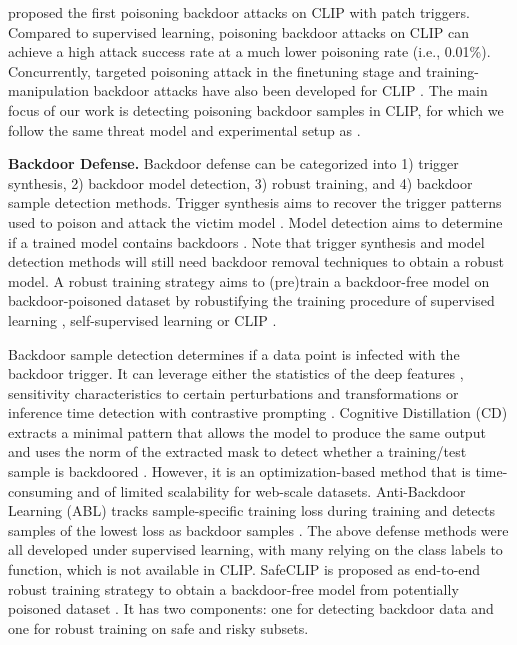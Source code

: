 \citet{carlini2022poisoning} proposed the first poisoning backdoor attacks on CLIP with patch triggers.
Compared to supervised learning, poisoning backdoor attacks on CLIP can achieve a high attack success rate at a much lower poisoning rate (i.e., 0.01\%). 
Concurrently, targeted poisoning attack in the finetuning stage \citep{yang2023data} and training-manipulation backdoor attacks have also been developed for CLIP \citep{jia2022badencoder,liu2022poisonedencoder,tao2023distribution}.
The main focus of our work is detecting poisoning backdoor samples in CLIP, for which we follow the same threat model and experimental setup as \citet{carlini2022poisoning}.


\noindent\textbf{Backdoor Defense.}
Backdoor defense can be categorized into 1) trigger synthesis, 2) backdoor model detection, 3) robust training, and 4)  backdoor sample detection methods. 
Trigger synthesis aims to recover the trigger patterns used to poison and attack the victim model \citep{liu2019abs,wang2019neural,hu2022trigger}. Model detection aims to determine if a trained model contains backdoors \citep{chen2019deepinspect,kolouri2020universal,xu2021detecting,feng2023detecting,kuang2024adversarial}. Note that trigger synthesis and model detection methods will still need backdoor removal techniques to obtain a robust model. A robust training strategy aims to (pre)train a backdoor-free model on backdoor-poisoned dataset by robustifying the training procedure of supervised learning \citep{li2021anti,borgnia2021strong,huang2022backdoor,dolatabadi2022collider}, self-supervised learning \citep{li2024difficulty} or CLIP \citep{bansal2023cleanclip,yang2023better,yang2023robust}. 

Backdoor sample detection determines if a data point is infected with the backdoor trigger. 
It can leverage either the statistics of the deep features \citep{tran2018spectral,chen2018detecting,tang2021demon}, sensitivity characteristics to certain perturbations and transformations \citep{gao2019strip,chen2022effective,hou2024ibd} or inference time detection with contrastive prompting \citep{niu2024bdetclip}. Cognitive Distillation (CD) extracts a minimal pattern that allows the model to produce the same output and uses the norm of the extracted mask to detect whether a training/test sample is backdoored \citep{huang2023distilling}. However, it is an optimization-based method that is time-consuming and of limited scalability for web-scale datasets.  
 Anti-Backdoor Learning (ABL) tracks sample-specific training loss during training and detects samples of the lowest loss as backdoor samples \citep{li2021anti}. 
The above defense methods were all developed under supervised learning, with many relying on the class labels to function, which is not available in CLIP.
SafeCLIP is proposed as end-to-end robust training strategy to obtain a backdoor-free model from potentially poisoned dataset \citep{yang2023better}. 
It has two components: one for detecting backdoor data and one for robust training on safe and risky subsets. 


